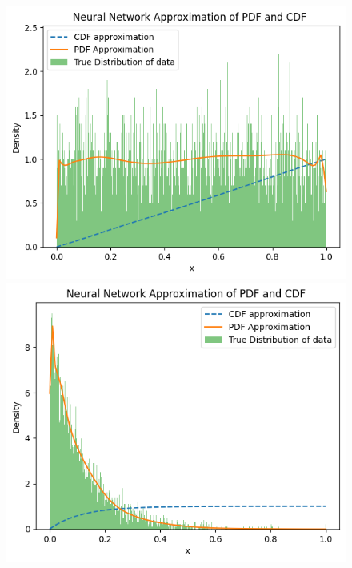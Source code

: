\begin{figure}
    \vspace{1em}

        \begin{minipage}{0.45\textwidth}
            \centering
            \includegraphics[width=\textwidth]{5ResultsDiscussion/pictures/MarginalTest/UniformHistogram.png}
        \end{minipage}
    \hfill
        \begin{minipage}{0.45\textwidth}
            \centering
            \includegraphics[width=\textwidth]{5ResultsDiscussion/pictures/MarginalTest/ExponentialHistogram.png}
        \end{minipage}


\end{figure}

